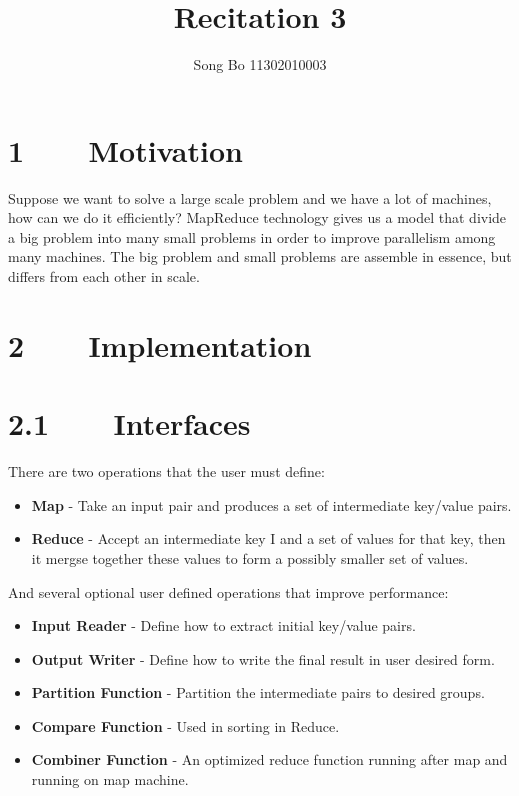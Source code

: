 \documentclass[a4paper]{article}
\title{Recitation 3}
\author{Song Bo 11302010003}
\begin{document}
 
  \maketitle 
 \section*{1~~~~Motivation}
 Suppose we want to solve a large scale problem and we have a lot of machines, how can we do it efficiently? MapReduce technology gives us a model that divide a big problem into many small problems in order to improve parallelism among many machines. The big problem and small problems are assemble in essence, but differs from each other in  scale.
 \section*{2~~~~Implementation}
 \section*{2.1~~~~Interfaces}
 There are two operations that the user must define:
 \begin{itemize}
 \item \textbf{Map} - Take an input pair and produces a set of intermediate key/value pairs.
 \item \textbf{Reduce} - Accept an intermediate key I and a set of values for that key, then it mergse together these values to form a possibly smaller set of values.
 \end{itemize}
 And several optional user defined operations that improve performance:
 \begin{itemize}
 \item \textbf{Input Reader} - Define how to extract initial key/value pairs.
 \item \textbf{Output Writer} - Define how to write the final result in user desired form.
 \item \textbf{Partition Function} - Partition the intermediate pairs to desired groups.
 \item \textbf{Compare Function} - Used in sorting in Reduce.
 \item \textbf{Combiner Function} - An optimized reduce function running after map and running on map machine.
 \end{itemize}
\end{document}
